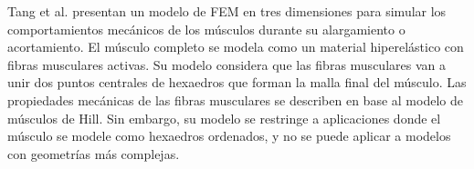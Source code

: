 %


Tang et al. \citep{tang20093d} presentan un modelo de FEM en tres dimensiones para simular los comportamientos mecánicos de los músculos durante su alargamiento o acortamiento. El músculo completo se modela como un material hiperelástico con fibras musculares activas. Su modelo considera que las fibras musculares van a unir dos puntos centrales de hexaedros que forman la malla final del músculo. Las propiedades mecánicas de las fibras musculares se describen en base al modelo de músculos de Hill. Sin embargo, su modelo se restringe a aplicaciones donde el músculo se modele como hexaedros ordenados, y no se puede aplicar a modelos con geometrías más complejas. 

